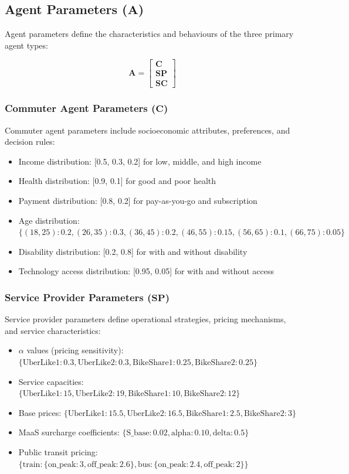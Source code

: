 \subsection{Agent Parameters \texorpdfstring{($\mathbf{A}$)}{(A)}}
Agent parameters define the characteristics and behaviours of the three primary agent types:

\begin{equation}
\mathbf{A} = \begin{bmatrix} \mathbf{C} \\ \mathbf{SP} \\ \mathbf{SC} \end{bmatrix}
\end{equation}

\subsubsection{Commuter Agent Parameters \texorpdfstring{($\mathbf{C}$)}{(C)}}
Commuter agent parameters include socioeconomic attributes, preferences, and decision rules:
\begin{itemize}
    \item Income distribution: [0.5, 0.3, 0.2] for low, middle, and high income
    \item Health distribution: [0.9, 0.1] for good and poor health
    \item Payment distribution: [0.8, 0.2] for pay-as-you-go and subscription
    \item Age distribution: $\{(18, 25): 0.2, (26, 35): 0.3, (36, 45): 0.2, (46, 55): 0.15, (56, 65): 0.1, (66, 75): 0.05\}$
    \item Disability distribution: [0.2, 0.8] for with and without disability
    \item Technology access distribution: [0.95, 0.05] for with and without access
\end{itemize}

\subsubsection{Service Provider Parameters \texorpdfstring{($\mathbf{SP}$)}{(SP)}}
Service provider parameters define operational strategies, pricing mechanisms, and service characteristics:
\begin{itemize}
    \item $\alpha$ values (pricing sensitivity): $\{\text{UberLike1}: 0.3, \text{UberLike2}: 0.3, \text{BikeShare1}: 0.25, \text{BikeShare2}: 0.25\}$
    \item Service capacities: $\{\text{UberLike1}: 15, \text{UberLike2}: 19, \text{BikeShare1}: 10, \text{BikeShare2}: 12\}$
    \item Base prices: $\{\text{UberLike1}: 15.5, \text{UberLike2}: 16.5, \text{BikeShare1}: 2.5, \text{BikeShare2}: 3\}$
    \item MaaS surcharge coefficients: $\{\text{S\_base}: 0.02, \text{alpha}: 0.10, \text{delta}: 0.5\}$
    \item Public transit pricing: $\{\text{train}: \{\text{on\_peak}: 3, \text{off\_peak}: 2.6\}, \text{bus}: \{\text{on\_peak}: 2.4, \text{off\_peak}: 2\}\}$
\end{itemize}

